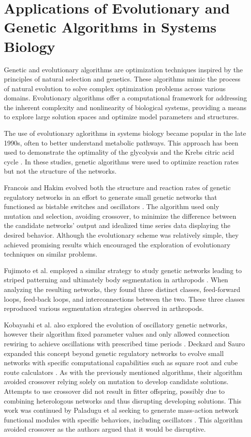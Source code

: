 \documentclass[12pt]{report}
\begin{document}
\section{Applications of Evolutionary and Genetic Algorithms in Systems Biology}
Genetic and evolutionary algorithms are optimization techniques inspired by the principles of natural selection and genetics. These algorithms mimic the process of natural evolution to solve complex optimization problems across various domains. Evolutionary algorithms offer a computational framework for addressing the inherent complexity and nonlinearity of biological systems, providing a means to explore large solution spaces and optimize model parameters and structures.

The use of evolutionary aglorithms in systems biology became popular in the late 1990s, often to better understand metabolic pathways. This approach has been used to demonstrate the optimality of the glycolysis \cite{Heinrich1999, stephani1999} and the Krebs citric acid cycle \cite{mittenthal2000}. In these studies, genetic algorithms were used to optimize reaction rates but not the structure of the networks.

Francois and Hakim evolved both the structure and reaction rates of genetic regulatory networks in an effort to generate small genetic networks that functioned as bistable switches and oscillators \cite{francois_hakim_2004}. The  algorithm used only mutation and selection, avoiding crossover, to minimize the difference between the candidate networks' output and idealized time series data displaying the desired behavior. Although the evolutionary scheme was relatively simple, they achieved promising results which encouraged the exploration of evolutionary techniques on similar problems.

Fujimoto et al. employed a similar strategy to study genetic networks leading to striped patterning and ultimately body segmentation in arthropods \cite{fujimoto_network_2008}. When analyzing the resulting networks, they found three distinct classes, feed-forward loops, feed-back loops, and interconnections between the two. These three classes reproduced various segmentation strategies observed in arthropods.

Kobayashi et al. also explored the evolution of oscillatory genetic networks, however their algorithm fixed parameter values and only allowed connection rewiring to achieve oscillations with prescribed time periods \cite{kobayashi_evolutionary_2010}. Deckard and Sauro expanded this concept beyond genetic regulatory networks to evolve small networks with specific computational capabilities such as square root and cube route calculators \cite{deckard_preliminary_2004}. As with the previously mentioned algorithms, their algorithm avoided crossover relying solely on mutation to develop candidate solutions. Attempts to use crossover did not result in fitter offspring, possibly due to combining heterologous networks and thus disrupting developing solutions. This work was continued by Paladugu et al seeking to generate mass-action network functional modules with specific behaviors, including oscillators \cite{Paladugu2006}.  This algorithm avoided crossover as the authors argued that it would be disruptive.
\end{document}
